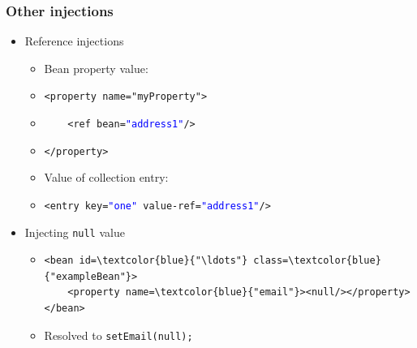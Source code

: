 \documentclass[10pt,xcolor=pdflatex, table]{beamer}
\begin{document}
\begin{frame}[fragile]\frametitle{Other injections}
	\begin{itemize}
		\item Reference injections
          \begin{itemize}
        	\item Bean property value:
        	\item[] \verb'<property name="myProperty">'
            \item[] \verb'    <ref bean='\textcolor{blue}{\texttt{"address1"}}\verb'/>'
            \item[] \verb'</property>'
			\item Value of collection entry:
			\item[] \verb'<entry key='\textcolor{blue}{\texttt{"one"}}\verb' value-ref='\textcolor{blue}{\texttt{"address1"}}\verb'/>'
          \end{itemize}
        \item Injecting \texttt{null} value
          \begin{itemize}
        	\item[] \begin{Verbatim}[fontsize=\footnotesize, commandchars=\\\{\}]
<bean id=\textcolor{blue}{"\ldots"} class=\textcolor{blue}{"exampleBean"}>
    <property name=\textcolor{blue}{"email"}><null/></property>
</bean> 
                \end{Verbatim}
            \item Resolved to \texttt{setEmail(null);}
          \end{itemize}
	\end{itemize}
\end{frame}
\end{document}
